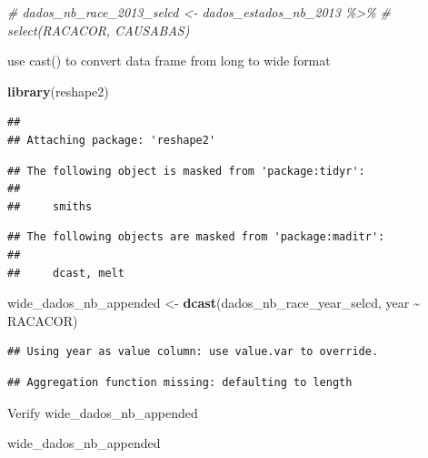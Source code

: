 \documentclass[
]{book}
\newenvironment{Shaded}{\begin{snugshade}}{\end{snugshade}}
\newcommand{\CommentTok}[1]{\textcolor[rgb]{0.56,0.35,0.01}{\textit{#1}}}
\newcommand{\FunctionTok}[1]{\textcolor[rgb]{0.13,0.29,0.53}{\textbf{#1}}}
\newcommand{\NormalTok}[1]{#1}
\newcommand{\OtherTok}[1]{\textcolor[rgb]{0.56,0.35,0.01}{#1}}
\newcommand{\SpecialCharTok}[1]{\textcolor[rgb]{0.81,0.36,0.00}{\textbf{#1}}}
\begin{document}
\begin{Shaded}
\begin{Highlighting}[]
\CommentTok{\# dados\_nb\_race\_2013\_selcd \textless{}{-} dados\_estados\_nb\_2013 \%\textgreater{}\%}
\CommentTok{\#   select(RACACOR, CAUSABAS)}
\end{Highlighting}
\end{Shaded}

\hfill\break

use cast() to convert data frame from long to wide format

\begin{Shaded}
\begin{Highlighting}[]
\FunctionTok{library}\NormalTok{(reshape2)}
\end{Highlighting}
\end{Shaded}

\begin{verbatim}
## 
## Attaching package: 'reshape2'
\end{verbatim}

\begin{verbatim}
## The following object is masked from 'package:tidyr':
## 
##     smiths
\end{verbatim}

\begin{verbatim}
## The following objects are masked from 'package:maditr':
## 
##     dcast, melt
\end{verbatim}

\begin{Shaded}
\begin{Highlighting}[]
\NormalTok{wide\_dados\_nb\_appended }\OtherTok{\textless{}{-}} \FunctionTok{dcast}\NormalTok{(dados\_nb\_race\_year\_selcd, year }\SpecialCharTok{\textasciitilde{}}\NormalTok{ RACACOR)}
\end{Highlighting}
\end{Shaded}

\begin{verbatim}
## Using year as value column: use value.var to override.
\end{verbatim}

\begin{verbatim}
## Aggregation function missing: defaulting to length
\end{verbatim}

\hfill\break

Verify wide\_dados\_nb\_appended

\begin{Shaded}
\begin{Highlighting}[]
\NormalTok{wide\_dados\_nb\_appended}
\end{Highlighting}
\end{Shaded}
\end{document}
